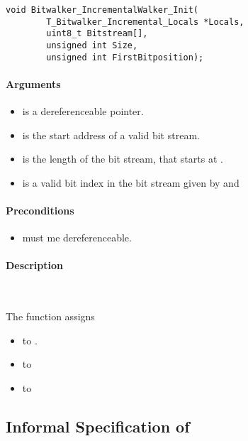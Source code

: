 \begin{lstlisting}[style=acsl-block]
void Bitwalker_IncrementalWalker_Init(
        T_Bitwalker_Incremental_Locals *Locals,
        uint8_t Bitstream[],
        unsigned int Size,
        unsigned int FirstBitposition);
\end{lstlisting}


\paragraph{Arguments}
\begin{itemize}
   \item  {} is a dereferenceable pointer.
   \item {} is  the start address of a valid bit stream.
   \item {} is the length of the bit stream, that starts at .
   \item {} is a valid bit index in the bit stream given by  and 
\end{itemize}

\paragraph{Preconditions}
\begin{itemize}
    \item  {} must me dereferenceable.
\end{itemize}

\paragraph{Description}~

The function \init assigns
\begin{itemize}
    \item {}  to .
    \item {} to 
    \item {} to 
\end{itemize}


\clearpage

\subsection{Informal Specification of }

